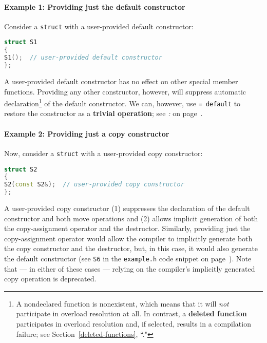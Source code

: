 \paragraph[Example 1: Providing just the default constructor]{Example 1: Providing just the default constructor}\label{example-1:-providing-just-the-default-constructor}

Consider a \texttt{struct} with a user-provided default constructor:

\begin{lstlisting}[language=C++]
struct S1
{
S1();  // user-provided default constructor
};
\end{lstlisting}

\noindent A user-provided default constructor has no effect on other special
member functions. Providing any other constructor, however, will
suppress automatic declaration{\cprotect\footnote{A nondeclared
function is nonexistent, which means that it will \emph{not}
participate in overload resolution at all. In contrast, a
\textbf{deleted function} participates in overload resolution and, if
selected, results in a compilation failure; see Section~\ref{deleted-functions}, ``."}} of the default constructor. We can, however, use
\texttt{=}~\texttt{default} to restore the constructor as a \textbf{trivial
operation}; see {\it{}: } on page~\pageref{restoring-the-generation-of-a-special-member-function-suppressed-by-another}.

\paragraph[Example 2: Providing just a copy constructor]{Example 2: Providing just a copy constructor}\label{example-2:-providing-just-a-copy-constructor}

Now, consider a \texttt{struct} with a user-provided copy constructor:

\begin{lstlisting}[language=C++]
struct S2
{
S2(const S2&);  // user-provided copy constructor
};
\end{lstlisting}

\noindent A user-provided copy constructor (1) suppresses the declaration of the
default constructor and both move operations and (2) allows implicit
generation of both the copy-assignment operator and the destructor.
Similarly, providing just the copy-assignment operator would allow the
compiler to implicitly generate both the copy constructor and the
destructor, but, in this case, it would also generate the default
constructor (see \texttt{S6} in the \texttt{example.h} code snippet on page~\pageref{default-exampleh-code}). Note that --- in either of these
cases --- relying on the compiler's implicitly generated copy operation
is deprecated.

